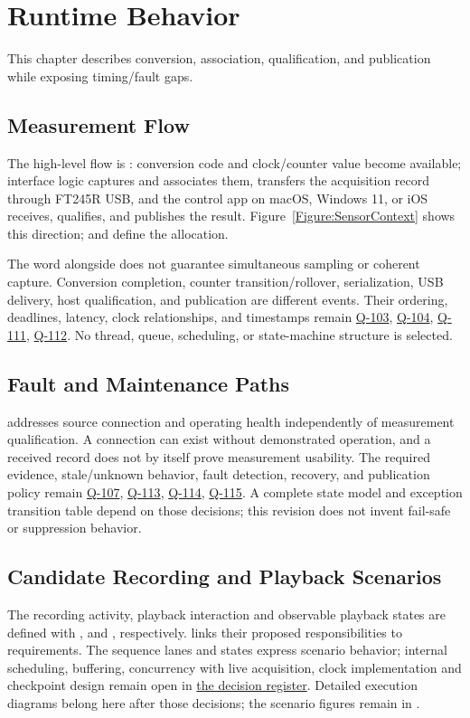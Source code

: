 \chapter{Runtime Behavior}
\label{Section:ProcessViewResponsibility}
This chapter describes conversion, association, qualification, and publication while exposing timing/fault gaps.


\section{Measurement Flow}
The high-level flow is : conversion code and clock/counter value become available; interface logic captures and associates them, transfers the acquisition record through FT245R USB, and the control app on macOS, Windows 11, or iOS receives, qualifies, and publishes the result. Figure~\ref{Figure:SensorContext} shows this direction;  and  define the allocation.

The word alongside does not guarantee simultaneous sampling or coherent capture. Conversion completion, counter transition/rollover, serialization, USB delivery, host qualification, and publication are different events. Their ordering, deadlines, latency, clock relationships, and timestamps remain \hyperref[Question:Q-103]{Q-103}, \hyperref[Question:Q-104]{Q-104}, \hyperref[Question:Q-111]{Q-111}, \hyperref[Question:Q-112]{Q-112}. No thread, queue, scheduling, or state-machine structure is selected.

\section{Fault and Maintenance Paths}
 addresses source connection and operating health independently of measurement qualification. A connection can exist without demonstrated operation, and a received record does not by itself prove measurement usability. The required evidence, stale/unknown behavior, fault detection, recovery, and publication policy remain \hyperref[Question:Q-107]{Q-107}, \hyperref[Question:Q-113]{Q-113}, \hyperref[Question:Q-114]{Q-114}, \hyperref[Question:Q-115]{Q-115}. A complete state model and exception transition table depend on those decisions; this revision does not invent fail-safe or suppression behavior.

\section{Candidate Recording and Playback Scenarios}
The recording activity, playback interaction and observable playback states are defined with ,  and , respectively.  links their proposed responsibilities to requirements. The sequence lanes and states express scenario behavior; internal scheduling, buffering, concurrency with live acquisition, clock implementation and checkpoint design remain open in \hyperref[Section:RecordingPlaybackDecisions]{the decision register}. Detailed execution diagrams belong here after those decisions; the scenario figures remain in .

